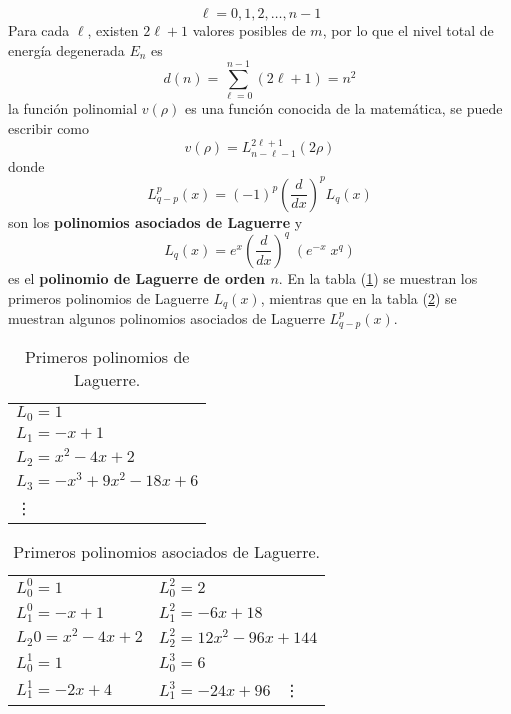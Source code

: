 \begin{equation}
\ell = 0, 1, 2, \ldots, n - 1
\label{eq:ecuacion_04_84}
\end{equation}
Para cada $\ell$, existen $2 \ell + 1$ valores posibles de $m$, por lo que el nivel total de energía degenerada $E_{n}$ es
\begin{equation}
d(n) = \sum_{\ell = 0}^{n - 1} (2 \ell + 1) = n^{2}
\label{eq:ecuacion_04_85}
\end{equation}
la función polinomial $v(\rho)$ es una función conocida de la matemática, se puede escribir como
\begin{equation}
v(\rho) = L_{n - \ell -1}^{2 \ell + 1}(2 \rho)
\label{eq:ecuacion_04_86}
\end{equation}
donde
\begin{equation}
L_{q - p}^{p} (x) = (-1)^{p} \left( \dfrac{d}{dx} \right)^{p} L_{q}(x)
\label{eq:ecuacion_04_87}
\end{equation}
son los \textbf{polinomios asociados de Laguerre} y
\begin{equation}
L_{q}(x) = e^{x} \left( \dfrac{d}{dx} \right)^{q} \; (e^{-x} \; x^{q} )
\label{eq:ecuacion_04_88}
\end{equation}
es el \textbf{polinomio de Laguerre de orden $n$}.
En la tabla (\ref{table:tabla_01}) se muestran los primeros polinomios de Laguerre $L_{q}(x)$, mientras que en la tabla (\ref{table:tabla_02}) se muestran algunos polinomios asociados de Laguerre $L_{q-p}^{p}(x)$.
\begin{table}[H]
\centering
\begin{tabular}{l}
$L_{0} = 1$ \\
$L_{1} = - x + 1$ \\
$L_{2} = x^{2} - 4 x + 2$ \\
$L_{3} = - x^{3} + 9 x^{2} - 18 x + 6$ \\
\vdots 
\end{tabular}
\caption{Primeros polinomios de Laguerre.}
\label{table:tabla_01}
\end{table}
\begin{table}[H]
\centering
\begin{tabular}{l l}
$L_{0}^{0} = 1$ & $L_{0}^{2} = 2$  \\
$L_{1}^{0} = - x + 1$ & $L_{1}^{2} = -6x + 18$ \\
$L_{2}{0} = x^{2} - 4 x + 2$ & $L_{2}^{2} = 12 x^{2} - 96 x + 144$ \\
$L_{0}^{1} = 1$ & $L_{0}^{3} = 6$ \\
$L_{1}^{1} = -2x + 4$ & $L_{1}^{3} = -24 x + 96$ \
\vdots 
\end{tabular}
\caption{Primeros polinomios asociados de Laguerre.}
\label{table:tabla_02}
\end{table}
